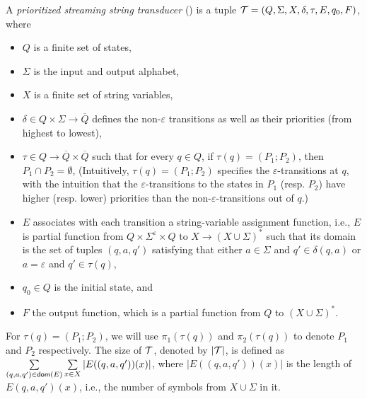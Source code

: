 \begin{definition}
A \emph{prioritized streaming string transducer} (\PSST) is a tuple $\mathcal{T} = (Q, \Sigma, X, \delta, \tau, E, q_0, F)$, where 
\begin{itemize}
\item $Q$ is a finite set of states, 
\item $\Sigma$ is the input and output alphabet, 
\item $X$ is a finite set of string variables, 
\item $\delta \in Q \times \Sigma \rightarrow \overline{Q}$ defines the non-$\varepsilon$ transitions as well as their priorities (from highest to lowest),
% 
\item $\tau \in Q \rightarrow \overline{Q} \times \overline{Q}$ such that for every $q \in Q$, if $\tau(q) = (P_1; P_2)$, then $P_1 \cap P_2 = \emptyset$, (Intuitively, $\tau(q)=(P_1; P_2)$ specifies the $\varepsilon$-transitions at $q$, with the intuition that the $\varepsilon$-transitions to the states in $P_1$ (resp. $P_2$) have higher (resp. lower) priorities than the non-$\varepsilon$-transitions out of $q$.)
\item $E$ associates with each transition a string-variable assignment function, i.e., $E$ is partial function from $Q \times \Sigma^\varepsilon \times
  Q$ to $X \rightarrow (X \cup \Sigma)^{\ast}$ such that its domain is the set of tuples $(q, a, q')$ satisfying that either $a \in \Sigma$ and $q' \in \delta(q, a)$ or $a = \varepsilon$ and $q' \in \tau(q)$,
\item  $q_0 \in Q$ is the initial state, and
\item  $F$ the output function, which is a partial function from $Q$ to $(X \cup \Sigma)^{\ast}$.
\end{itemize}
\end{definition}
For $\tau(q)=(P_1; P_2)$, we will use $\pi_1(\tau(q))$ and $\pi_2(\tau(q))$ to denote $P_1$ and $P_2$ respectively.  
The size of $\mathcal{T}$, denoted by $|\mathcal{T}|$, is defined as $\sum \limits_{(q, a, q') \in \mathsf{dom}(E)} \sum \limits_{x \in X} |E((q, a, q'))(x)|$, where $|E((q, a, q'))(x)|$ is the length of $E(q, a, q')(x)$, i.e., the number of symbols from $X \cup \Sigma$ in it.

